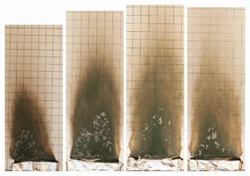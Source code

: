 \documentclass[twoside]{uocthesis}
\begin{document}
\begin{figure}[p]
	\includegraphics[width=1.0in]{../Figures/GBPUF1_IMG_9332}
	\includegraphics[width=1.0in]{../Figures/GBPUF2_IMG_9347}
	\includegraphics[width=1.0in]{../Figures/GBPUF3_IMG_9362}
	\includegraphics[width=1.0in]{../Figures/GBPUF4_IMG_9376}

\end{figure}
\end{document}
